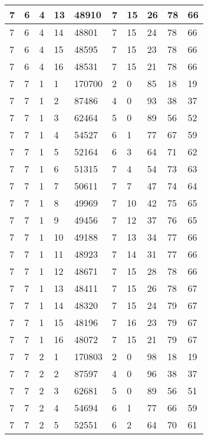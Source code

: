 \begin{table}[!ht]
\begin{tabular}{|l|l|l|l|l|l|l|l|l|l|}
        7 & 6 & 4 & 13 & 48910 & 7 & 15 & 26 & 78 & 66 \\ \hline
        7 & 6 & 4 & 14 & 48801 & 7 & 15 & 24 & 78 & 66 \\ \hline
        7 & 6 & 4 & 15 & 48595 & 7 & 15 & 23 & 78 & 66 \\ \hline
        7 & 6 & 4 & 16 & 48531 & 7 & 15 & 21 & 78 & 66 \\ \hline
        7 & 7 & 1 & 1 & 170700 & 2 & 0 & 85 & 18 & 19 \\ \hline
        7 & 7 & 1 & 2 & 87486 & 4 & 0 & 93 & 38 & 37 \\ \hline
        7 & 7 & 1 & 3 & 62464 & 5 & 0 & 89 & 56 & 52 \\ \hline
        7 & 7 & 1 & 4 & 54527 & 6 & 1 & 77 & 67 & 59 \\ \hline
        7 & 7 & 1 & 5 & 52164 & 6 & 3 & 64 & 71 & 62 \\ \hline
        7 & 7 & 1 & 6 & 51315 & 7 & 4 & 54 & 73 & 63 \\ \hline
        7 & 7 & 1 & 7 & 50611 & 7 & 7 & 47 & 74 & 64 \\ \hline
        7 & 7 & 1 & 8 & 49969 & 7 & 10 & 42 & 75 & 65 \\ \hline
        7 & 7 & 1 & 9 & 49456 & 7 & 12 & 37 & 76 & 65 \\ \hline
        7 & 7 & 1 & 10 & 49188 & 7 & 13 & 34 & 77 & 66 \\ \hline
        7 & 7 & 1 & 11 & 48923 & 7 & 14 & 31 & 77 & 66 \\ \hline
        7 & 7 & 1 & 12 & 48671 & 7 & 15 & 28 & 78 & 66 \\ \hline
        7 & 7 & 1 & 13 & 48411 & 7 & 15 & 26 & 78 & 67 \\ \hline
        7 & 7 & 1 & 14 & 48320 & 7 & 15 & 24 & 79 & 67 \\ \hline
        7 & 7 & 1 & 15 & 48196 & 7 & 16 & 23 & 79 & 67 \\ \hline
        7 & 7 & 1 & 16 & 48072 & 7 & 15 & 21 & 79 & 67 \\ \hline
        7 & 7 & 2 & 1 & 170803 & 2 & 0 & 98 & 18 & 19 \\ \hline
        7 & 7 & 2 & 2 & 87597 & 4 & 0 & 96 & 38 & 37 \\ \hline
        7 & 7 & 2 & 3 & 62681 & 5 & 0 & 89 & 56 & 51 \\ \hline
        7 & 7 & 2 & 4 & 54694 & 6 & 1 & 77 & 66 & 59 \\ \hline
        7 & 7 & 2 & 5 & 52551 & 6 & 2 & 64 & 70 & 61 \\ \hline

\end{tabular}
\end{table}
